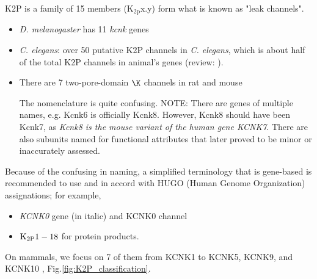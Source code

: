 K2P is a family of 15 members (K$_\text{2p}$x.y) form what is
known as "leak channels". 
\begin{itemize}
  \item {\it D. melanogaster} has 11 {\it kcnk} genes
  
  \item {\it C. elegans}: over 50 putative K2P channels in {\it C.
  elegans}, which is about half of the total K2P channels in animal's genes
  (review: \citep{OConnell2002}).

  \item   There are 7 two-pore-domain $\K$ channels in rat and mouse

The nomenclature is quite confusing. NOTE: There are genes of multiple names,
e.g. Kcnk6 is officially Kcnk8. However, Kcnk8 should have been Kcnk7, as {\it
Kcnk8 is the mouse variant of the human gene KCNK7}. There are also subunits
named for functional attributes that later proved to be minor or inaccurately
assessed.
 
\end{itemize}


Because of the confusing in naming, a simplified terminology that is gene-based
is recommended to use and in accord with HUGO (Human Genome Organization)
assignations; for example, 
\begin{itemize}
  \item  {\it KCNK0} gene (in italic) and KCNK0 channel
  \item {\bf ${\text{K}_{\text{2P}}}1-18$} for protein products.
\end{itemize}
On mammals, we focus on 7 of them from KCNK1 to KCNK5, KCNK9, and KCNK10
\citep{talley2001}, Fig.\ref{fig:K2P_classification}.

